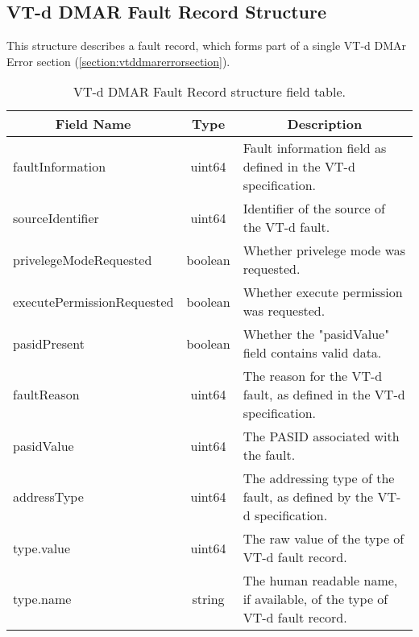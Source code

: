 \documentclass{report}
\newcommand*{\thead}[1]{\multicolumn{1}{|c|}{\bfseries #1}}
\newcommand*{\jsontable}[1]{
    \begin{table}[!ht]
    \label{#1}
    \centering
    \begin{adjustbox}{center}
    \begin{tabular}{|l|c|p{8cm}|}
    \hline
    \thead{Field Name} & \thead{Type} & \thead{Description} \\
    \hline
}
\newcommand*{\jsontableend}[1]{
    \hline
    \end{tabular}
    \end{adjustbox}
    \caption{#1}
    \label{table:#1}
    \end{table}
    \FloatBarrier
}
\begin{document}
\subsection{VT-d DMAR Fault Record Structure}
\label{subsection:vtddmarfaultrecordstructure}
This structure describes a fault record, which forms part of a single VT-d DMAr Error section (\ref{section:vtddmarerrorsection}).
\jsontable{table:vtddmarfaultrecordstructure}
faultInformation & uint64 & Fault information field as defined in the VT-d specification.\\
\hline
sourceIdentifier & uint64 & Identifier of the source of the VT-d fault.\\
\hline
privelegeModeRequested & boolean & Whether privelege mode was requested.\\
\hline
executePermissionRequested & boolean & Whether execute permission was requested.\\
\hline
pasidPresent & boolean & Whether the "pasidValue" field contains valid data.\\
\hline
faultReason & uint64 & The reason for the VT-d fault, as defined in the VT-d specification.\\
\hline
pasidValue & uint64 & The PASID associated with the fault.\\
\hline
addressType & uint64 & The addressing type of the fault, as defined by the VT-d specification.\\
\hline
type.value & uint64 & The raw value of the type of VT-d fault record.\\
type.name & string & The human readable name, if available, of the type of VT-d fault record.\\
\jsontableend{VT-d DMAR Fault Record structure field table.}

\end{document}
